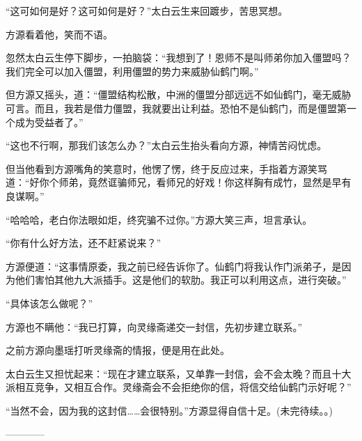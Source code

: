\begin{this_body}
“这可如何是好？这可如何是好？”太白云生来回踱步，苦思冥想。

方源看着他，笑而不语。

忽然太白云生停下脚步，一拍脑袋：“我想到了！恩师不是叫师弟你加入僵盟吗？我们完全可以加入僵盟，利用僵盟的势力来威胁仙鹤门啊。”

但方源又摇头，道：“僵盟结构松散，中洲的僵盟分部远远不如仙鹤门，毫无威胁可言。而且，我若是借力僵盟，我就要出让利益。恐怕不是仙鹤门，而是僵盟第一个成为受益者了。”

“这也不行啊，那我们该怎么办？”太白云生抬头看向方源，神情苦闷忧虑。

但当他看到方源嘴角的笑意时，他愣了愣，终于反应过来，手指着方源笑骂道：“好你个师弟，竟然诓骗师兄，看师兄的好戏！你这样胸有成竹，显然是早有良谋啊。”

“哈哈哈，老白你法眼如炬，终究骗不过你。”方源大笑三声，坦言承认。

“你有什么好方法，还不赶紧说来？”

方源便道：“这事情原委，我之前已经告诉你了。仙鹤门将我认作门派弟子，是因为他们害怕其他九大派插手。这是他们的软肋。我正可以利用这点，进行突破。”

“具体该怎么做呢？”

方源也不瞒他：“我已打算，向灵缘斋递交一封信，先初步建立联系。”

之前方源向墨瑶打听灵缘斋的情报，便是用在此处。

太白云生又担忧起来：“现在才建立联系，又单靠一封信，会不会太晚？而且十大派相互竞争，又相互合作。灵缘斋会不会拒绝你的信，将信交给仙鹤门示好呢？”

“当然不会，因为我的这封信……会很特别。”方源显得自信十足。(未完待续。。)

------------

\end{this_body}

